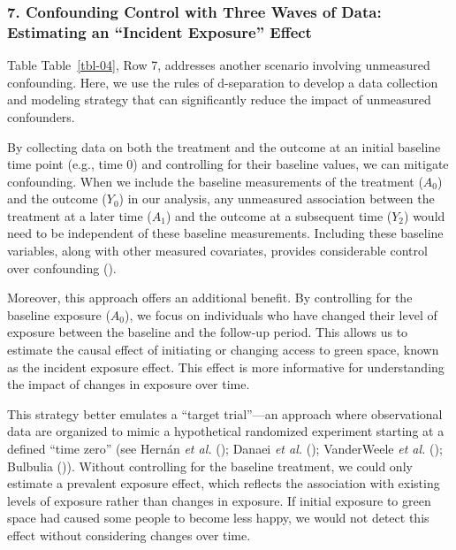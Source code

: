 \documentclass[
  singlecolumn]{article}
\begin{document}
\subsubsection{7. Confounding Control with Three Waves of Data:
Estimating an ``Incident Exposure''
Effect}\label{confounding-control-with-three-waves-of-data-estimating-an-incident-exposure-effect}

Table Table~\ref{tbl-04}, Row 7, addresses another scenario involving
unmeasured confounding. Here, we use the rules of d-separation to
develop a data collection and modeling strategy that can significantly
reduce the impact of unmeasured confounders.

By collecting data on both the treatment and the outcome at an initial
baseline time point (e.g., time 0) and controlling for their baseline
values, we can mitigate confounding. When we include the baseline
measurements of the treatment (\(A_0\)) and the outcome (\(Y_0\)) in our
analysis, any unmeasured association between the treatment at a later
time (\(A_1\)) and the outcome at a subsequent time (\(Y_2\)) would need
to be independent of these baseline measurements. Including these
baseline variables, along with other measured covariates, provides
considerable control over confounding
().

Moreover, this approach offers an additional benefit. By controlling for
the baseline exposure (\(A_0\)), we focus on individuals who have
changed their level of exposure between the baseline and the follow-up
period. This allows us to estimate the causal effect of initiating or
changing access to green space, known as the incident exposure effect.
This effect is more informative for understanding the impact of changes
in exposure over time.

This strategy better emulates a ``target trial''---an approach where
observational data are organized to mimic a hypothetical randomized
experiment starting at a defined ``time zero'' (see Hernán \emph{et al.}
(); Danaei \emph{et al.}
(); VanderWeele \emph{et al.}
(); Bulbulia
()). Without controlling for the
baseline treatment, we could only estimate a prevalent exposure effect,
which reflects the association with existing levels of exposure rather
than changes in exposure. If initial exposure to green space had caused
some people to become less happy, we would not detect this effect
without considering changes over time.
\end{document}
